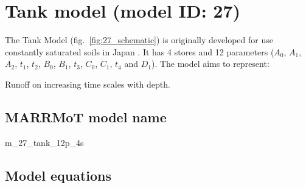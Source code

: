 \section{Tank model (model ID: 27)}
The Tank Model (fig.~\ref{fig:27_schematic}) is originally developed for use constantly saturated soils in Japan \citep{Sugawara1979,Sugawara1995}. It has 4 stores and 12 parameters ($A_0$, $A_1$, $A_2$, $t_1$, $t_2$, $B_0$, $B_1$, $t_3$, $C_0$, $C_1$, $t_4$ and $D_1$). The model aims to represent:

\begin{itemizecompact}
\item Runoff on increasing time scales with depth.
\end{itemizecompact}

\subsection{MARRMoT model name}
m\_27\_tank\_12p\_4s \\

\subsection{Model equations}

